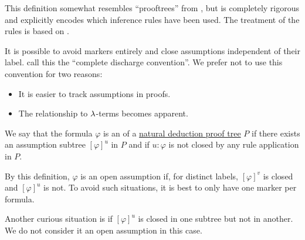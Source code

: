 \begin{comments}
  \item This definition somewhat resembles \enquote{prooftrees} from , but is completely rigorous and explicitly encodes which inference rules have been used. The treatment of the rules is based on .

  \item It is possible to avoid markers entirely and close assumptions independent of their label.  call this the \enquote{complete discharge convention}. We prefer not to use this convention for two reasons:
  \begin{itemize}
    \item It is easier to track assumptions in proofs.
    \item The relationship to \( \mathrm{\lambda} \)-terms becomes apparent.
  \end{itemize}
\end{comments}

\begin{definition}\label{def:natural_deduction_open_assumptions}\mimprovised
  We say that the formula \( \varphi \) is an  of a \hyperref[def:natural_deduction_proof_tree]{natural deduction proof tree} \( P \) if there exists an assumption subtree \( [\varphi]^u \) in \( P \) and if \( u: \varphi \) is not closed by any rule application in \( P \).
\end{definition}
\begin{comments}
  \item By this definition, \( \varphi \) is an open assumption if, for distinct labels, \( [\varphi]^v \) is closed and \( [\varphi]^u \) is not. To avoid such situations, it is best to only have one marker per formula.
  \item Another curious situation is if \( [\varphi]^u \) is closed in one subtree but not in another. We do not consider it an open assumption in this case.
\end{comments}

